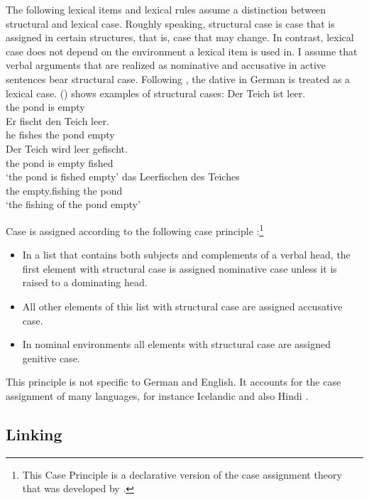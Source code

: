 \largerpage
The following lexical items and lexical rules assume a distinction between structural and lexical
case. Roughly speaking, structural case is case that is assigned in certain structures, that is,
case that may change. In contrast, lexical case does not depend on the environment a
lexical item is used in. I assume that verbal arguments that are realized as nominative and
accusative in active sentences bear structural case. Following \citet{Haider86}, the dative in German is treated as a lexical
case. () shows examples of structural cases:
\eal
\ex 
\gll Der Teich ist leer.\\
     the pond is empty\\
\ex 
\gll Er fischt den Teich leer.\\
     he fishes the pond empty\\
\ex 
\gll Der Teich wird leer gefischt.\\
     the pond is empty fished\\
\glt `the pond is fished empty'
\ex 
\gll das Leerfischen des Teiches\\
     the empty.fishing the pond\\
\glt `the fishing of the pond empty'
\zl

Case is assigned according to the following case principle \citep{Prze99,Meurers99b}:\footnote{%
  This Case Principle is a declarative version of the case assignment theory that was developed by
  \citet*{YMJ87}.
}

\begin{principle-break}
\label{case-p}
\begin{itemize}
\item In a list that contains both subjects and complements of a verbal head,
the first element with structural case is assigned nominative case unless it is raised
to a dominating head.
\item All other elements of this list with structural case are assigned accusative case.
\item In nominal environments all elements with structural case are assigned genitive case.
\end{itemize}
\end{principle-break}

This principle is not specific to German and English. It accounts for the case assignment of many languages, for
instance Icelandic \citep{MuellerGermanic} and also Hindi \citep{MuellerCoreGram}.

\subsection{Linking}

